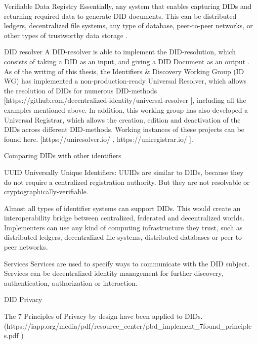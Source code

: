 Verifiable Data Registry
Essentially, any system that enables capturing DIDs and returning required data to generate DID documents. This can be distributed ledgers, decentralized file systems, any type of database, peer-to-peer networks, or other types of trustworthy data storage \cite{sporny_longley_sabadello_reed_steele_2021}.

DID resolver
A DID-resolver is able to implement the DID-resolution, which consists of taking a DID as an input, and giving a DID Document as an output \cite{sporny_longley_sabadello_reed_steele_2021}. As of the writing of this thesis, the Identifiers & Discovery Working Group (ID WG) has implemented a non-production-ready Universal Resolver, which allows the resolution of DIDs for numerous DID-methods [https://github.com/decentralized-identity/universal-resolver ], including all the examples mentioned above. In addition, this working group has also developed a Universal Registrar, which allows the creation, edition and deactivation of the DIDs across different DID-methods. Working instances of these projects can be found here. [https://uniresolver.io/ , https://uniregistrar.io/ ].

Comparing DIDs with other identifiers


UUID Universally Unique Identifiers: 
UUIDs are similar to DIDs, because they do not require a centralized registration authority. But they are not resolvable or cryptographically-verifiable. 


 






Almost all types of identifier systems can support DIDs. This would create an interoperability bridge between centralized, federated and decentralized worlds. Implementers can use any kind of computing infrastructure they trust, such as distributed ledgers, decentralized file systems, distributed databases or peer-to-peer networks. 


Services
Services are used to specify ways to communicate with the DID subject. Services can be decentralized identity management for further discovery, authentication, authorization or interaction. 


DID Privacy 

The 7 Principles of Privacy by design have been applied to DIDs. (https://iapp.org/media/pdf/resource_center/pbd_implement_7found_principles.pdf )

